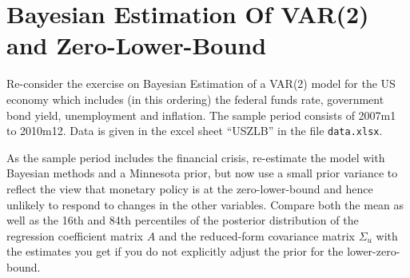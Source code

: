 \documentclass{article}
\begin{document}
\newpage
\section[Bayesian Estimation of VAR(2) and Zero-Lower-Bound]{Bayesian Estimation Of VAR(2) and Zero-Lower-Bound\label{ex:BayesianEstimationVARTwoZLB}}
Re-consider the exercise on Bayesian Estimation of a VAR(2) model for the US economy which includes (in this ordering) the federal funds rate, government bond yield, unemployment and inflation. The sample period consists of 2007m1 to 2010m12. Data is given in the excel sheet \enquote{USZLB} in the file \texttt{data.xlsx}.

As the sample period includes the financial crisis, re-estimate the model with Bayesian methods and a Minnesota prior, but now use a small prior variance to reflect the view that monetary policy is at the zero-lower-bound and hence unlikely to respond to changes in the other variables. Compare both the mean as well as the 16th and 84th percentiles of the posterior distribution of the regression coefficient matrix $A$ and the reduced-form covariance matrix $\Sigma_u$ with the estimates you get if you do not explicitly adjust the prior for the lower-zero-bound.


\newpage
\end{document}
